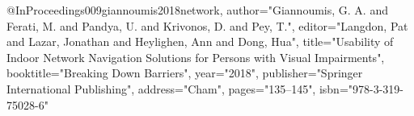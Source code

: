 @InProceedings{009giannoumis2018network,
author="Giannoumis, G. A.
and Ferati, M.
and Pandya, U.
and Krivonos, D.
and Pey, T.",
editor="Langdon, Pat
and Lazar, Jonathan
and Heylighen, Ann
and Dong, Hua",
title="Usability of Indoor Network Navigation Solutions for Persons with Visual Impairments",
booktitle="Breaking Down Barriers",
year="2018",
publisher="Springer International Publishing",
address="Cham",
pages="135--145",
isbn="978-3-319-75028-6"
}